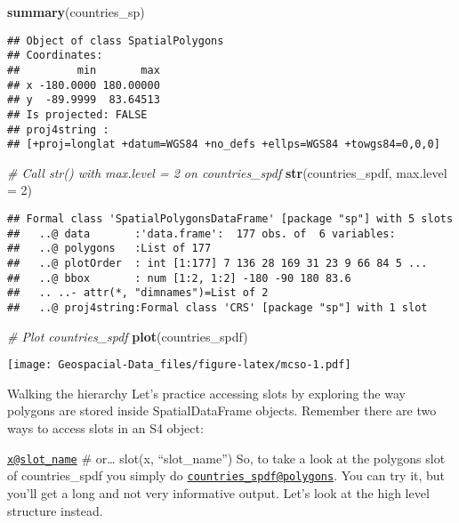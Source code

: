 \documentclass[]{article}
\newenvironment{Shaded}{\begin{snugshade}}{\end{snugshade}}
\newcommand{\CommentTok}[1]{\textcolor[rgb]{0.56,0.35,0.01}{\textit{#1}}}
\newcommand{\DataTypeTok}[1]{\textcolor[rgb]{0.13,0.29,0.53}{#1}}
\newcommand{\DecValTok}[1]{\textcolor[rgb]{0.00,0.00,0.81}{#1}}
\newcommand{\KeywordTok}[1]{\textcolor[rgb]{0.13,0.29,0.53}{\textbf{#1}}}
\newcommand{\NormalTok}[1]{#1}
\begin{document}
\begin{Shaded}
\begin{Highlighting}[]
\KeywordTok{summary}\NormalTok{(countries_sp)}
\end{Highlighting}
\end{Shaded}

\begin{verbatim}
## Object of class SpatialPolygons
## Coordinates:
##         min       max
## x -180.0000 180.00000
## y  -89.9999  83.64513
## Is projected: FALSE 
## proj4string :
## [+proj=longlat +datum=WGS84 +no_defs +ellps=WGS84 +towgs84=0,0,0]
\end{verbatim}

\begin{Shaded}
\begin{Highlighting}[]
\CommentTok{# Call str() with max.level = 2 on countries_spdf}
\KeywordTok{str}\NormalTok{(countries_spdf, }\DataTypeTok{max.level =} \DecValTok{2}\NormalTok{)}
\end{Highlighting}
\end{Shaded}

\begin{verbatim}
## Formal class 'SpatialPolygonsDataFrame' [package "sp"] with 5 slots
##   ..@ data       :'data.frame':  177 obs. of  6 variables:
##   ..@ polygons   :List of 177
##   ..@ plotOrder  : int [1:177] 7 136 28 169 31 23 9 66 84 5 ...
##   ..@ bbox       : num [1:2, 1:2] -180 -90 180 83.6
##   .. ..- attr(*, "dimnames")=List of 2
##   ..@ proj4string:Formal class 'CRS' [package "sp"] with 1 slot
\end{verbatim}

\begin{Shaded}
\begin{Highlighting}[]
\CommentTok{# Plot countries_spdf}
\KeywordTok{plot}\NormalTok{(countries_spdf)}
\end{Highlighting}
\end{Shaded}

\texttt{[image: Geospacial-Data\_files/figure-latex/mcso-1.pdf]}

Walking the hierarchy Let's practice accessing slots by exploring the
way polygons are stored inside SpatialDataFrame objects. Remember there
are two ways to access slots in an S4 object:

\href{mailto:x@slot_name}{\nolinkurl{x@slot\_name}} \# or\ldots{}
slot(x, ``slot\_name'') So, to take a look at the polygons slot of
countries\_spdf you simply do
\href{mailto:countries_spdf@polygons}{\nolinkurl{countries\_spdf@polygons}}.
You can try it, but you'll get a long and not very informative output.
Let's look at the high level structure instead.
\end{document}
